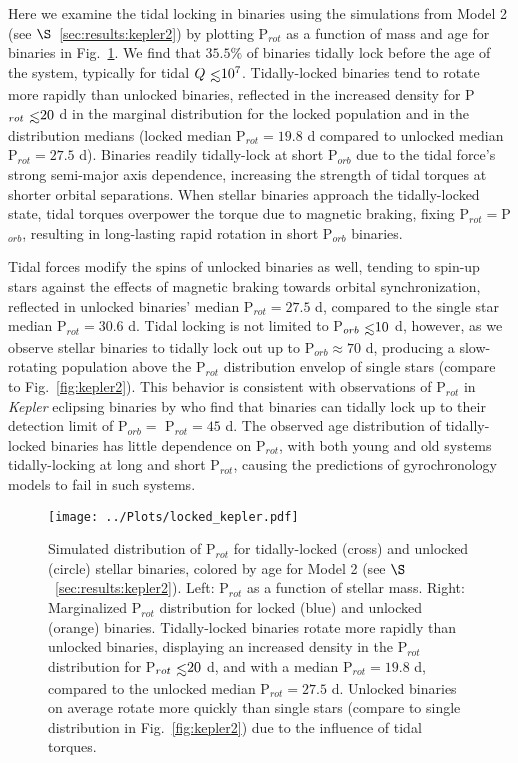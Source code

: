 \documentclass[twocolumn]{aastex61}
\def\lsim{~\rlap{$<$}{\lower 1.0ex\hbox{$\sim$}}}
\begin{document}
Here we examine the tidal locking in binaries using the simulations from Model 2 (see $\S$~\ref{sec:results:kepler2}) by plotting P$_{rot}$ as a function of mass and age for binaries in Fig.~\ref{fig:locking}. We find that $35.5\%$ of binaries tidally lock before the age of the system, typically for tidal $Q \lsim 10^7$. Tidally-locked binaries tend to rotate more rapidly than unlocked binaries, reflected in the increased density for P$_{rot} \lsim 20$ d in the marginal distribution for the locked population and in the distribution medians (locked median P$_{rot} = 19.8$ d compared to unlocked median P$_{rot} = 27.5$ d). Binaries readily tidally-lock at short P$_{orb}$ due to the tidal force's strong semi-major axis dependence, increasing the strength of tidal torques at shorter orbital separations. When stellar binaries approach the tidally-locked state, tidal torques overpower the torque due to magnetic braking, fixing P$_{rot} = $P$_{orb}$, resulting in long-lasting rapid rotation in short P$_{orb}$ binaries. 

Tidal forces modify the spins of unlocked binaries as well, tending to spin-up stars against the effects of magnetic braking towards orbital synchronization, reflected in unlocked binaries' median P$_{rot} = 27.5$ d, compared to the single star median P$_{rot} = 30.6$ d. Tidal locking is not limited to P$_{orb} \lsim 10$ d, however, as we observe stellar binaries to tidally lock out up to P$_{orb} \approx 70$ d, producing a slow-rotating population above the P$_{rot}$ distribution envelop of single stars (compare to Fig.~\ref{fig:kepler2}). This behavior is consistent with observations of P$_{rot}$ in \textit{Kepler} eclipsing binaries by \citet{Lurie2017} who find that binaries can tidally lock up to their detection limit of P$_{orb} = $ P$_{rot} = 45$ d. The observed age distribution of tidally-locked binaries has little dependence on P$_{rot}$, with both young and old systems tidally-locking at long and short P$_{rot}$, causing the predictions of gyrochronology models to fail in such systems. 

\begin{figure}[h]
	\texttt{[image: ../Plots/locked\_kepler.pdf]}
   \caption{Simulated distribution of P$_{rot}$ for tidally-locked (cross) and unlocked (circle) stellar binaries, colored by age for Model 2 (see $\S$~\ref{sec:results:kepler2}). Left: P$_{rot}$ as a function of stellar mass.  Right: Marginalized P$_{rot}$ distribution for locked (blue) and unlocked (orange) binaries.  Tidally-locked binaries rotate more rapidly than unlocked binaries, displaying an increased density in the P$_{rot}$ distribution for P$_{rot} {\lsim} 20$ d, and with a median P$_{rot} = 19.8$ d, compared to the unlocked median P$_{rot} = 27.5$ d. Unlocked binaries on average rotate more quickly than single stars (compare to single distribution in Fig.~\ref{fig:kepler2}) due to the influence of tidal torques.}
    \label{fig:locking}
\end{figure}
\end{document}
